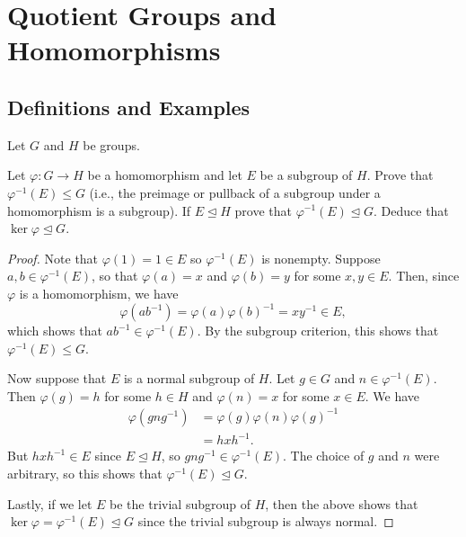 \chapter{Quotient Groups and Homomorphisms}

\section{Definitions and Examples}

Let $G$ and $H$ be groups.

 Let $\varphi\colon G\to H$ be a homomorphism and let $E$ be
a subgroup of $H$. Prove that $\varphi^{-1}(E)\leq G$ (i.e., the
preimage or pullback of a subgroup under a homomorphism is a
subgroup). If $E\trianglelefteq H$ prove that
$\varphi^{-1}(E)\trianglelefteq G$. Deduce that
$\ker\varphi\trianglelefteq G$.
\begin{proof}
  Note that $\varphi(1) = 1\in E$ so $\varphi^{-1}(E)$ is
  nonempty. Suppose $a, b \in \varphi^{-1}(E)$, so that
  $\varphi(a) = x$ and $\varphi(b) = y$ for some $x,y\in E$. Then,
  since $\varphi$ is a homomorphism, we have
  \begin{equation*}
    \varphi(ab^{-1}) = \varphi(a)\varphi(b)^{-1} = xy^{-1} \in E,
  \end{equation*}
  which shows that $ab^{-1}\in\varphi^{-1}(E)$. By the subgroup
  criterion, this shows that $\varphi^{-1}(E)\leq G$.

  Now suppose that $E$ is a normal subgroup of $H$. Let $g\in G$ and
  $n\in\varphi^{-1}(E)$. Then $\varphi(g) = h$ for some $h\in H$ and
  $\varphi(n) = x$ for some $x\in E$. We have
  \begin{align*}
    \varphi(gng^{-1})
    &= \varphi(g)\varphi(n)\varphi(g)^{-1} \\
    &= hxh^{-1}.
  \end{align*}
  But $hxh^{-1}\in E$ since $E\trianglelefteq H$, so
  $gng^{-1}\in\varphi^{-1}(E)$. The choice of $g$ and $n$ were
  arbitrary, so this shows that $\varphi^{-1}(E)\trianglelefteq G$.

  Lastly, if we let $E$ be the trivial subgroup of $H$, then the above
  shows that $\ker\varphi = \varphi^{-1}(E) \trianglelefteq G$ since
  the trivial subgroup is always normal.
\end{proof}


